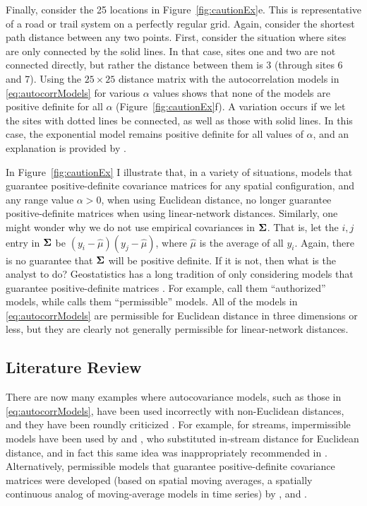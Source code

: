 \documentclass[11pt, titlepage]{article}\usepackage[]{graphicx}\usepackage[]{color}
\begin{document}
\begin{spacing}{1.9}
\begin{flushleft}
Finally, consider the 25 locations in Figure~\ref{fig:cautionEx}e.  This is representative of a road or trail system on a perfectly regular grid.  Again, consider the shortest path distance between any two points.  First, consider the situation where sites are only connected by the solid lines.  In that case, sites one and two are not connected directly, but rather the distance between them is 3 (through sites 6 and 7).  Using the $25 \times 25$ distance matrix with the autocorrelation models in \ref{eq:autocorrModels} for various $\alpha$ values shows that none of the models are positive definite for all $\alpha$ (Figure~\ref{fig:cautionEx}f). A variation occurs if we let the sites with dotted lines be connected, as well as those with solid lines.  In this case, the exponential model remains positive definite for all values of $\alpha$, and an explanation is provided by \citet{Curr:NonE:2006}.

In Figure~\ref{fig:cautionEx} I illustrate that, in a variety of situations, models that guarantee positive-definite covariance matrices for any spatial configuration, and any range value $\alpha > 0$, when using Euclidean distance, no longer guarantee positive-definite matrices when using linear-network distances. Similarly, one might wonder why we do not use empirical covariances in $\mbox{\boldmath $\Sigma$}$.  That is, let the $i,j$ entry in $\mbox{\boldmath $\Sigma$}$ be $(y_i - \hat{\mu})(y_j - \hat{\mu})$, where $\hat{\mu}$ is the average of all $y_i$.  Again, there is no guarantee that $\mbox{\boldmath $\Sigma$}$ will be positive definite.  If it is not, then what is the analyst to do? Geostatistics has a long tradition of only considering models that guarantee positive-definite matrices \citep[][p. 161]{Jour:Huij:mini:1978}. For example, \citet[][p. 80]{Webs:Oliv:geos:2007} call them ``authorized'' models, while \citet[][p. 87]{Goov:geos:1997} calls them ``permissible'' models.  All of the models in \ref{eq:autocorrModels} are permissible for Euclidean distance in three dimensions or less, but they are clearly not generally permissible for linear-network distances.

\subsection*{Literature Review}

There are now many examples where autocovariance models, such as those in \ref{eq:autocorrModels}, have been used incorrectly with non-Euclidean distances, and they have been roundly criticized \citep{Curr:NonE:2006}.  For example, for streams, impermissible models have been used by \citet{Cres:Maju:spat:1997} and \citet{Gard:Sull:Lemb:pred:2003}, who substituted in-stream distance for Euclidean distance, and in fact this same idea was inappropriately recommended in \citet{Okab:Sugi:spat:2012}. Alternatively, permissible models that guarantee positive-definite covariance matrices were developed (based on spatial moving averages, a spatially continuous analog of moving-average models in time series) by \citet{Ver:Pete:Theo:spat:2006}, \citet{Cres:Frey:Harc:Smit:spat:2006} and \citet{Ver:Pete:Move:2010}. 


\end{flushleft}
\end{spacing}
\end{document}
